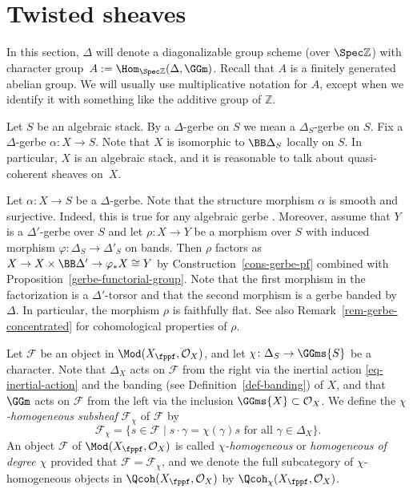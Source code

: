 \section{Twisted sheaves}
\label{sec:quasi-coher-sheav}
In this section, $\Delta$ will denote a diagonalizable group scheme (over $\Spec \mathbb{Z}$)
with character group~$A := \Hom_{\Spec\mathbb{Z}}(\Delta, \GGm)$.
Recall that $A$ is a finitely generated abelian group.
We will usually use multiplicative notation for $A$,
except when we identify it with something like the additive group of $\mathbb{Z}$.

Let $S$ be an algebraic stack.
By a $\Delta$-gerbe on $S$ we mean a $\Delta_S$-gerbe on
$S$.
Fix a $\Delta$-gerbe $\alpha\colon X \to S$.
Note that $X$ is isomorphic to $\BB \Delta_S$ locally on $S$.
In particular, $X$ is an algebraic stack,
and it is reasonable to talk about quasi-coherent sheaves on~$X$.

\begin{remark}
\label{rem-gerbe-ff}
Let $\alpha\colon X \to S$ be a $\Delta$-gerbe.
Note that the structure morphism $\alpha$ is smooth and surjective.
Indeed, this is true for any algebraic gerbe
\cite[Proposition~A.2]{bergh2017}.
Moreover, assume that $Y$ is a $\Delta'$-gerbe over $S$
and let $\rho\colon X \to Y$ be a morphism over $S$ with induced morphism $\varphi\colon \Delta_S \to \Delta'_S$ on bands.
Then $\rho$ factors as $X \to X\times\BB \Delta' \to \varphi_*X \cong Y$ by Construction~\ref{cons-gerbe-pf}
combined with Proposition~\ref{gerbe-functorial-group}.
Note that the first morphism in the factorization is a
$\Delta'$-torsor 
and that the second morphism is a gerbe banded by~$\Delta$.
In particular, the morphism $\rho$ is faithfully flat.
See also Remark~\ref{rem-gerbe-concentrated} for cohomological properties of $\rho$.
\end{remark}

\begin{definition}
\label{def-homogeneous-sheaf}
Let $\mathcal{F}$ be an object in $\Mod(X_\fppf, \mathcal{O}_X)$,
and let $\chi\colon \Delta_S \to \GGms{S}$ be a character.
Note that $\Delta_X$ acts on $\mathcal{F}$ from the right via the inertial action \eqref{eq-inertial-action}
and the banding (see Definition~\ref{def-banding}) of $X$,
and that $\GGm$ acts on $\mathcal{F}$ from the left via the inclusion $\GGms{X} \subset \mathcal{O}_X$.
We define the \emph{$\chi$-homogeneous subsheaf} $\mathcal{F}_\chi$ of $\mathcal{F}$ by
\begin{equation}
  \label{eq:chi-subsheaf}
  \mathcal{F}_\chi = \{s \in \mathcal{F} \mid 
  \text{$s\cdot\gamma = \chi(\gamma)s$ for all $\gamma
  \in \Delta_X$}\}.
\end{equation}
An object $\mathcal{F}$ of $\Mod(X_\fppf, \mathcal{O}_X)$ is
called \emph{$\chi$-homogeneous}
or \emph{homogeneous of degree $\chi$}
provided that $\mathcal{F} = \mathcal{F}_\chi$,
and we denote the full subcategory of $\chi$-homogeneous objects in $\Qcoh(X_\fppf, \mathcal{O}_X)$
by $\Qcoh_\chi(X_\fppf, \mathcal{O}_X)$.
\end{definition}

